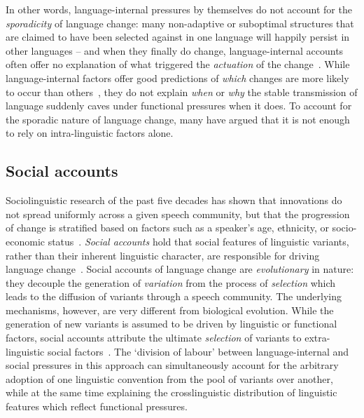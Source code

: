 \documentclass[10pt]{article}
\begin{document}
In other words, language-internal pressures by themselves do not account for the \emph{sporadicity} of language change: many non-adaptive or suboptimal structures that are claimed to have been selected against in one language will happily persist in other languages -- and when they finally do change, language-internal accounts often offer no explanation of what triggered the \emph{actuation} of the change~\citep{Saussure1959,Postal1968,Ohala1993}. While language-internal factors offer good predictions of \emph{which} changes are more likely to occur than others~\citep{Jaeger2010,Wedel2013short}, they do not explain \emph{when} or \emph{why} the stable transmission of language suddenly caves under functional pressures when it does. To account for the sporadic nature of language change, many have argued that it is not enough to rely on intra-linguistic factors alone.

\subsection{Social accounts}

Sociolinguistic research of the past five decades has shown that innovations do not spread uniformly across a given speech community, but that the progression of change is stratified based on factors such as a speaker's age, ethnicity, or socio-economic status~\citep{Foulkes2006,Tagliamonte2012}. \emph{Social accounts} hold that social features of linguistic variants, rather than their inherent linguistic character, are responsible for driving language change~\citep{Sturtevant1947,Croft2000,Labov2001,Croft2006}. Social accounts of language change are \emph{evolutionary} in nature: they decouple the generation of \emph{variation} from the process of \emph{selection} which leads to the diffusion of variants through a speech community. The underlying mechanisms, however, are very different from biological evolution. While the generation of new variants is assumed to be driven by linguistic or functional factors, social accounts attribute the ultimate \emph{selection} of variants to extra-linguistic social factors~\citep{Ohala1989,Croft2000,Labov2001,Stevens2013}. The `division of labour' between language-internal and social pressures in this approach can simultaneously account for the arbitrary adoption of one linguistic convention from the pool of variants over another, while at the same time explaining the crosslinguistic distribution of linguistic features which reflect functional pressures.
\end{document}
